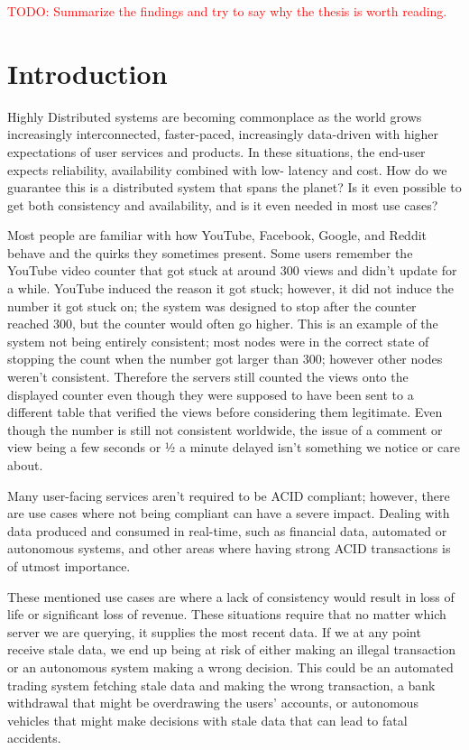 \documentclass[a4paper,10pt,titlepage]{report}
\begin{document}
\textcolor{red}{TODO: Summarize the findings and try to say why the thesis is worth reading.}




\chapter{Introduction}
Highly Distributed systems are becoming commonplace as the world grows increasingly interconnected, faster-paced, increasingly data-driven with higher expectations of user services and products. In these situations, the end-user expects reliability, availability combined with low- latency and cost. How do we guarantee this is a distributed system that spans the planet? Is it even possible to get both consistency and availability, and is it even needed in most use cases?\\
\vspace{5mm}


Most people are familiar with how YouTube, Facebook, Google, and Reddit behave and the quirks they sometimes present. Some users remember the YouTube video counter that got stuck at around 300 views and didn't update for a while. YouTube induced the reason it got stuck; however, it did not induce the number it got stuck on; the system was designed to stop after the counter reached 300, but the counter would often go higher. This is an example of the system not being entirely consistent; most nodes were in the correct state of stopping the count when the number got larger than 300; however other nodes weren't consistent. Therefore the servers still counted the views onto the displayed counter even though they were supposed to have been sent to a different table that verified the views before considering them legitimate. Even though the number is still not consistent worldwide, the issue of a comment or view being a few seconds or ½ a minute delayed isn't something we notice or care about. 

Many user-facing services aren't required to be ACID compliant; however, there are use cases where not being compliant can have a severe impact. Dealing with data produced and consumed in real-time, such as financial data, automated or autonomous systems, and other areas where having strong ACID transactions is of utmost importance. 

These mentioned use cases are where a lack of consistency would result in loss of life or significant loss of revenue. These situations require that no matter which server we are querying, it supplies the most recent data. If we at any point receive stale data, we end up being at risk of either making an illegal transaction or an autonomous system making a wrong decision. This could be an automated trading system fetching stale data and making the wrong transaction, a bank withdrawal that might be overdrawing the users' accounts, or autonomous vehicles that might make decisions with stale data that can lead to fatal accidents. \\
\end{document}
